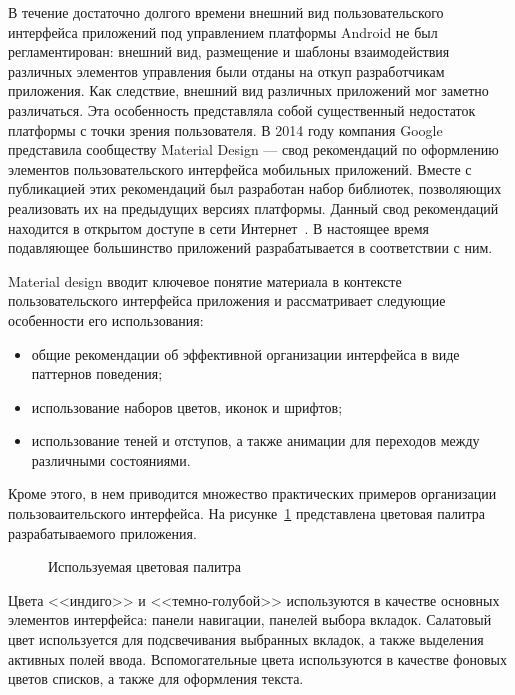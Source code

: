 В течение достаточно долгого времени внешний вид пользовательского интерфейса
приложений под управлением платформы Android не был регламентирован:
внешний вид, размещение и шаблоны взаимодействия различных элементов управления
были отданы на откуп разработчикам приложения.
Как следствие, внешний вид различных приложений мог заметно различаться.
Эта особенность представляла собой существенный недостаток платформы
с точки зрения пользователя.
В 2014 году компания Google представила сообществу Material Design ---
свод рекомендаций по оформлению элементов пользовательского интерфейса
мобильных приложений. Вместе с публикацией этих рекомендаций был
разработан набор библиотек, позволяющих реализовать их на предыдущих версиях платформы.
Данный свод рекомендаций находится в открытом доступе в сети
Интернет~\cite{material_design}.
В настоящее время подавляющее большинство приложений разрабатывается
в соответствии с ним.

Material design вводит ключевое понятие материала в контексте
пользовательского интерфейса приложения и рассматривает следующие
особенности его использования:
\begin{itemize}
\item общие рекомендации об эффективной организации интерфейса
  в виде паттернов поведения;
\item использование наборов цветов, иконок и шрифтов;
\item использование теней и отступов,
  а также анимации для переходов между различными состояниями.
\end{itemize}

Кроме этого, в нем приводится множество практических примеров
организации пользоваительского интерфейса.
На рисунке~\ref{fig:design_colors} представлена цветовая палитра
разрабатываемого приложения.

\begin{figure}[h!]
  \centering
  \caption{Используемая цветовая палитра}
  \label{fig:design_colors}
\end{figure}

Цвета <<индиго>> и <<темно-голубой>>
используются в качестве основных элементов интерфейса:
панели навигации, панелей выбора вкладок.
Салатовый цвет используется для подсвечивания выбранных вкладок,
а также выделения активных полей ввода.
Вспомогательные цвета используются в качестве фоновых цветов списков,
а также для оформления текста.

